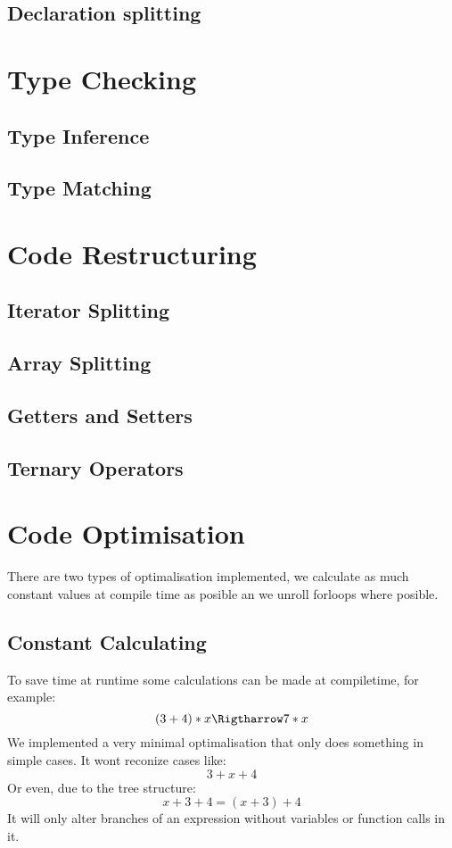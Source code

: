 \documentclass[a4paper,11pt]{report}
\begin{document}
\subsection{Declaration splitting}

\section{Type Checking}
\subsection{Type Inference}
\subsection{Type Matching}

\section{Code Restructuring}
\subsection{Iterator Splitting}
\subsection{Array Splitting}
\subsection{Getters and Setters}
\subsection{Ternary Operators}

\section{Code Optimisation}
There are two types of optimalisation implemented, we calculate as much constant values at compile time as posible an we unroll forloops where posible.
\subsection{Constant Calculating}
To save time at runtime some calculations can be made at compiletime, for example:
\[
(3+4)*x \Rigtharrow 7*x
\]
We implemented a very minimal optimalisation that only does something in simple cases.
It wont reconize cases like:
\[
3+x+4
\]
Or even, due to the tree structure:
\[
x+3+4 = (x+3)+4
\]
It will only alter branches of an expression without variables or function calls in it.
\end{document}
